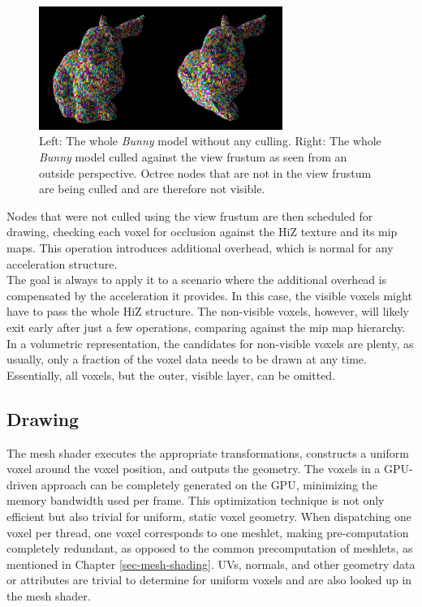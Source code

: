 \begin{figure}[!htb]
    \centering
    \includegraphics[width=300px]{images/graphics/bunny-frustum-culling.jpg}
    \caption{Left: The whole \emph{Bunny} model without any culling. 
    Right: The whole \emph{Bunny} model culled against the view frustum as seen from an outside perspective. 
    Octree nodes that are not in the view frustum are being culled and are therefore not visible.}
    \label{fig:bunny-frustum-culling}
\end{figure}

\noindent
Nodes that were not culled using the view frustum are then scheduled for drawing, checking each voxel for occlusion against the 
\ac{HiZ} texture and its mip maps. This operation introduces additional overhead, which is normal for any acceleration structure. \\

\noindent
The goal is always to apply it to a scenario where the additional overhead is compensated by the acceleration it provides. 
In this case, the visible voxels might have to pass the whole \ac{HiZ} structure. The non-visible voxels, however, will likely 
exit early after just a few operations, comparing against the mip map hierarchy. In a volumetric representation, the candidates 
for non-visible voxels are plenty, as usually, only a fraction of the voxel data needs to be drawn at any time. Essentially, 
all voxels, but the outer, visible layer, can be omitted.

\subsection*{Drawing} \label{subsec-mesh-shader}

The mesh shader executes the appropriate transformations, constructs a uniform voxel around the voxel position, 
and outputs the geometry. The voxels in a \ac{GPU}-driven approach can be completely generated on the \ac{GPU}, 
minimizing the memory bandwidth used per frame. This optimization technique is not only efficient but also 
trivial for uniform, static voxel geometry. When dispatching one voxel per thread, one voxel corresponds 
to one meshlet, making pre-computation completely redundant, as opposed to the common precomputation of meshlets, 
as mentioned in Chapter \ref{sec-mesh-shading}. UVs, normals, and other geometry data or attributes are 
trivial to determine for uniform voxels and are also looked up in the mesh shader.


